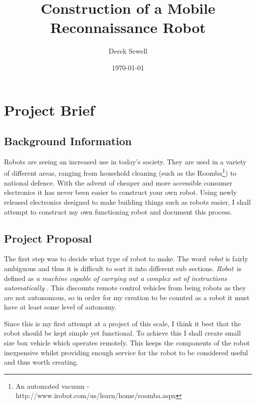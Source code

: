 \documentclass[]{report}   %
\begin{document}
		

        \title{Construction of a Mobile Reconnaissance Robot}   %
        \author{Derek Sewell}         %
        \date{\today}    %
        \maketitle
		
		


		\chapter{Project Brief}             %
			\section{Background Information}     %
				Robots are seeing an increased use in today's
				society. They are used in a variety of different areas, ranging from household cleaning
				(such as the Roomba\footnote{An automated vacuum - http://www.irobot.com/us/learn/home/roomba.aspx})
				to national defence. With the advent of cheaper and more accessible consumer electronics it has never been
				easier to construct your own robot. Using newly released electronics designed to make building things such
				as robots easier, I shall attempt to construct my own functioning robot and document this process.
			
			\section{Project Proposal}
				The first step was to decide what type of robot to make. The word \emph{robot} is fairly ambiguous and thus
				it is difficult to sort it into different sub sections. \emph{Robot}\ is defined as
				\emph{a machine capable of carrying out a complex set of instructions automatically} \cite{robotdef}.
				This discounts remote control vehicles from being robots as they are not autonomous, so in order for my 
				creation to be counted as a robot it must have at least some level of autonomy.
					
				Since this is my first attempt at a project of this scale, I think it best that the robot should be kept
				simple yet functional. To achieve this I shall create small size box vehicle which operates remotely. This
				keeps the components of the robot inexpensive whilst providing enough service for the robot to be
				considered useful and thus worth creating.
					
\end{document}

